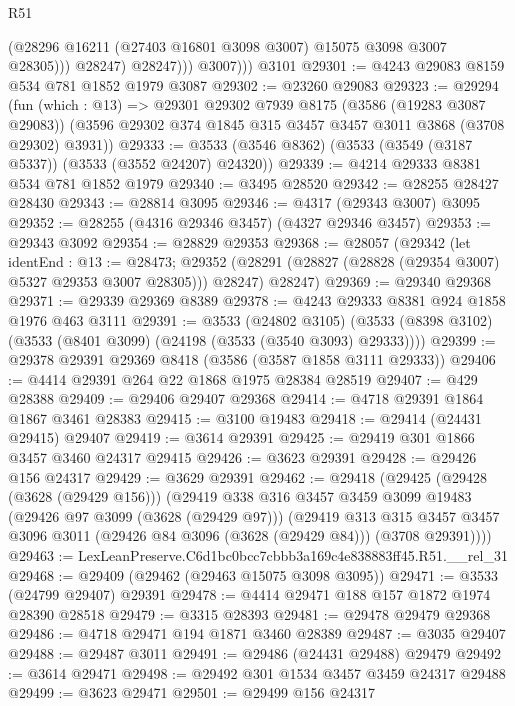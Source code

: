 \begin{lexlean}{R51}
\begin{coremodule}
                    (@28296 @16211 (@27403 @16801 @3098 @3007) @15075 @3098 @3007 @28305)))
                @28247)
              @28247)))
          @3007)))
    @3101
@29301 := @4243 @29083 @8159 @534 @781 @1852 @1979 @3087
@29302 := @23260 @29083
@29323 := @29294
    (fun (which : @13) =>
    @29301
      @29302
      @7939
      @8175
      (@3586 (@19283 @3087 @29083))
      (@3596 @29302 @374 @1845 @315 @3457 @3457 @3011 @3868 (@3708 @29302) @3931))
@29333 := @3533 (@3546 @8362) (@3533 (@3549 (@3187 @5337)) (@3533 (@3552 @24207) @24320))
@29339 := @4214 @29333 @8381 @534 @781 @1852 @1979
@29340 := @3495 @28520
@29342 := @28255 @28427 @28430
@29343 := @28814 @3095
@29346 := @4317 (@29343 @3007) @3095
@29352 := @28255 (@4316 @29346 @3457) (@4327 @29346 @3457)
@29353 := @29343 @3092
@29354 := @28829 @29353
@29368 := @28057
    (@29342
      (let identEnd : @13 := @28473;
      @29352 (@28291 (@28827 (@28828 (@29354 @3007) @5327 @29353 @3007 @28305))) @28247)
      @28247)
@29369 := @29340 @29368
@29371 := @29339 @29369 @8389
@29378 := @4243 @29333 @8381 @924 @1858 @1976 @463 @3111
@29391 := @3533
    (@24802 @3105)
    (@3533 (@8398 @3102) (@3533 (@8401 @3099) (@24198 (@3533 (@3540 @3093) @29333))))
@29399 := @29378 @29391 @29369 @8418 (@3586 (@3587 @1858 @3111 @29333))
@29406 := @4414 @29391 @264 @22 @1868 @1975 @28384 @28519
@29407 := @429 @28388
@29409 := @29406 @29407 @29368
@29414 := @4718 @29391 @1864 @1867 @3461 @28383
@29415 := @3100 @19483
@29418 := @29414 (@24431 @29415) @29407
@29419 := @3614 @29391
@29425 := @29419 @301 @1866 @3457 @3460 @24317 @29415
@29426 := @3623 @29391
@29428 := @29426 @156 @24317
@29429 := @3629 @29391
@29462 := @29418
    (@29425
      (@29428 (@3628 (@29429 @156)))
      (@29419
        @338
        @316
        @3457
        @3459
        @3099
        @19483
        (@29426 @97 @3099 (@3628 (@29429 @97)))
        (@29419
          @313
          @315
          @3457
          @3457
          @3096
          @3011
          (@29426 @84 @3096 (@3628 (@29429 @84)))
          (@3708 @29391))))
@29463 := LexLeanPreserve.C6d1bc0bcc7cbbb3a169c4e838883ff45.R51.__rel_31
@29468 := @29409 (@29462 (@29463 @15075 @3098 @3095))
@29471 := @3533 (@24799 @29407) @29391
@29478 := @4414 @29471 @188 @157 @1872 @1974 @28390 @28518
@29479 := @3315 @28393
@29481 := @29478 @29479 @29368
@29486 := @4718 @29471 @194 @1871 @3460 @28389
@29487 := @3035 @29407
@29488 := @29487 @3011
@29491 := @29486 (@24431 @29488) @29479
@29492 := @3614 @29471
@29498 := @29492 @301 @1534 @3457 @3459 @24317 @29488
@29499 := @3623 @29471
@29501 := @29499 @156 @24317

\end{coremodule}
\end{lexlean}
